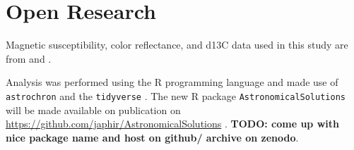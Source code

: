 \documentclass[draft]{agujournal2019}
\begin{document}
%
%

%

%



\section{Open Research}
Magnetic susceptibility, color reflectance, and \gls{d13C} data used in this study are from  and .

Analysis was performed using the R programming language \cite{RCoreTeam2020} and made use of \texttt{astrochron}  and the \texttt{tidyverse} .
The new R package \texttt{AstronomicalSolutions} will be made available on publication on \url{https://github.com/japhir/AstronomicalSolutions} .
\textbf{TODO: come up with nice package name and host on github/ archive on zenodo}.


\end{document}
